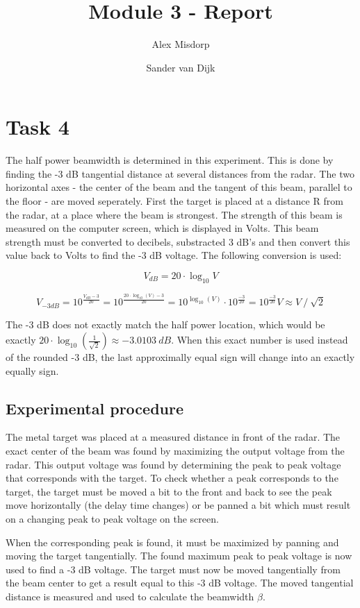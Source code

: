 \documentclass[final]{scrreprt} %
\title{Module 3 - Report}
\author{Alex {Misdorp} \and Sander {van Dijk}}
\begin{document}
\chapter{Task 4}
The half power beamwidth is determined in this experiment. This is done by finding the -3 dB tangential distance at several distances from the radar. The two horizontal axes - the center of the beam and the tangent of this beam, parallel to the floor - are moved seperately. First the target is placed at a distance R from the radar, at a place where the beam is strongest. The strength of this beam is measured on the computer screen, which is displayed in Volts. This beam strength must be converted to decibels, substracted 3 dB's and then convert this value back to Volts to find the -3 dB voltage. The following conversion is used:

\begin{equation}
	V_{dB} = 20 \cdot \log_10 V
\end{equation}

\begin{equation}
	V_{-3 dB} = 10^{\frac{V_{dB} - 3}{20}} = 10^{\frac{20 \cdot \log_{10}(V) - 3}{20}} = 10^{\log_{10}(V)} \cdot 10^{\frac{-3}{20}} = 10^{\frac{-3}{20}} V \approx V~/~\sqrt{2}
\end{equation}

The -3 dB does not exactly match the half power location, which would be exactly $20 \cdot \log_{10} (\frac{1}{\sqrt{2}}) \approx -3.0103~dB $. When this exact number is used instead of the rounded -3 dB, the last approximally equal sign will change into an exactly equally sign.

\section{Experimental procedure}
The metal target was placed at a measured distance in front of the radar. The exact center of the beam was found by maximizing the output voltage from the radar. This output voltage was found by determining the peak to peak voltage that corresponds with the target. To check whether a peak corresponds to the target, the target must be moved a bit to the front and back to see the peak move horizontally (the delay time changes) or be panned a bit which must result on a changing peak to peak voltage on the screen.

When the corresponding peak is found, it must be maximized by panning and moving the target tangentially. The found maximum peak to peak voltage is now used to find a -3 dB voltage. The target must now be moved tangentially from the beam center to get a result equal to this -3 dB voltage. The moved tangential distance is measured and used to calculate the beamwidth $\beta$.
\end{document}
